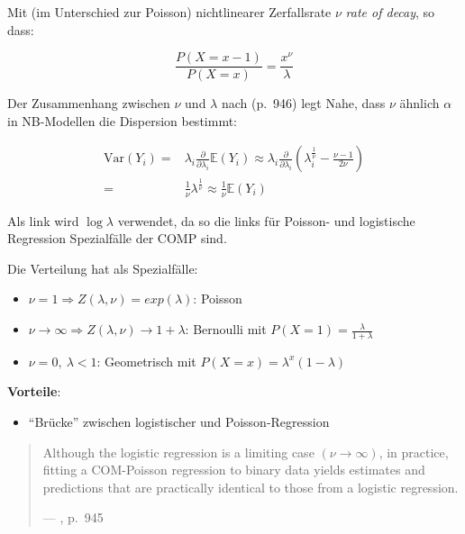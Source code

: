 \documentclass[ngerman,a4paper,]{scrartcl}
\providecommand{\tightlist}{%
  \setlength{\itemsep}{0pt}\setlength{\parskip}{0pt}}
\theoremstyle{definition}
\theoremstyle{definition}
\theoremstyle{definition}
\theoremstyle{remark}
\begin{document}
Mit (im Unterschied zur Poisson) nichtlinearer Zerfallsrate \(\nu\) \emph{rate of decay}, so dass:

\begin{equation}  
\frac{P(X = x -1)}{P(X = x)} = \frac{x^\nu}{\lambda}
\end{equation}

Der Zusammenhang zwischen \(\nu\) und \(\lambda\) nach \citet{sellers2010FlexibleRegression} (p.~946) legt Nahe, dass \(\nu\) ähnlich \(\alpha\) in NB-Modellen die Dispersion bestimmt:

\begin{align*}
  \mathrm{Var}(Y_i) =& \lambda_i \frac{\partial}{\partial \lambda_i} \mathbb{E}(Y_i)
            \approx \lambda_i \frac{\partial}{\partial \lambda_i} \left( \lambda_i^{\frac{1}{\nu}} - \frac{\nu - 1}{2 \nu} \right) \\
                  =& \frac{1}{\nu} \lambda^{\frac{1}{\nu}}
           \approx \frac{1}{\nu} \mathbb{E}(Y_i)
\end{align*}

Als link wird \(\log \lambda\) verwendet, da so die links für Poisson- und logistische Regression Spezialfälle der COMP sind.

Die Verteilung hat als Spezialfälle:

\begin{itemize}
\tightlist
\item
  \(\nu = 1 \Longrightarrow Z(\lambda, \nu) = exp(\lambda)\): Poisson
\item
  \(\nu \to \infty \Longrightarrow Z(\lambda, \nu) \to 1 + \lambda\): Bernoulli mit \(P(X = 1) = \frac{\lambda}{1+\lambda}\)
\item
  \(\nu = 0,\ \lambda < 1\): Geometrisch mit \(P(X = x) = \lambda^x (1 - \lambda)\)
\end{itemize}

\textbf{Vorteile}:

\begin{itemize}
\tightlist
\item
  \enquote{Brücke} zwischen logistischer und Poisson-Regression \citep{sellers2010FlexibleRegression}
\end{itemize}

\begin{quote}
Although the logistic regression is a limiting case \((\nu \to \infty)\), in practice, fitting a COM-Poisson regression to binary data yields estimates and predictions that are practically identical to those from a logistic regression.

--- \citet{sellers2010FlexibleRegression}, p.~945
\end{quote}
\end{document}
